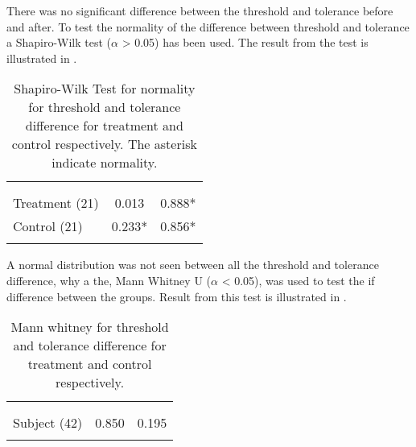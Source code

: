 There was no significant difference between the threshold and tolerance before and after. To test the normality of the difference between threshold and tolerance a Shapiro-Wilk test ($\alpha$ > 0.05) has been used. The result from the test is illustrated in .

\begin{longtable} {l|c|c}
 \rowcolor[HTML]{C0C0C0} 
  \color[HTML]{000000}{} & 
 \multicolumn{1}{c|}{ \color[HTML]{000000}{\textbf{Threshold}}} & \multicolumn{1}{c}{ \color[HTML]{000000}{\textbf{Tolerance}}}  	\\  \rule{0pt}{3ex} 
  \cellcolor[HTML]{C0C0C0}{} &
 \multicolumn{1}{c|}{ \cellcolor[HTML]{C0C0C0}{Difference }} & \multicolumn{1}{|c}{ \cellcolor[HTML]{C0C0C0}{Difference}}  	\\ \hline
Treatment (21) & 0.013 &  0.888* \\ \hline
Control (21) & 0.233*  & 0.856*  \\ \hline
	\caption{Shapiro-Wilk Test for normality for threshold and tolerance difference for treatment and control respectively. The asterisk indicate normality.}
	\label{tab:ShapiroWilk2}
\end{longtable}
\vspace{-.5cm}

A normal distribution was not seen between all the threshold and tolerance difference, why a the, Mann Whitney U ($\alpha$ < 0.05), was used to test the if difference between the groups. Result from this test is illustrated in .

\begin{longtable} {l|c|c}
 \rowcolor[HTML]{C0C0C0} 
  \color[HTML]{000000}{} & 
 \multicolumn{1}{c|}{ \color[HTML]{000000}{\textbf{Threshold}}} & \multicolumn{1}{c}{ \color[HTML]{000000}{\textbf{Tolerance}}}  	\\  \rule{0pt}{3ex} 
  \cellcolor[HTML]{C0C0C0}{} &
 \multicolumn{1}{c|}{ \cellcolor[HTML]{C0C0C0}{Difference }} & \multicolumn{1}{|c}{ \cellcolor[HTML]{C0C0C0}{Difference}}  	\\ \hline
Subject (42) & 0.850 & 0.195 \\ \hline
	\caption{Mann whitney for threshold and tolerance difference for treatment and control respectively.}	\label{tab:MannWhitney1}
\end{longtable}
\vspace{-.5cm}


